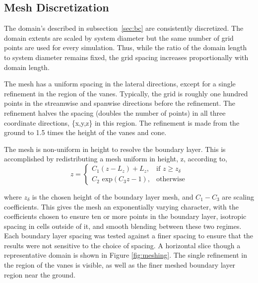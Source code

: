 %
%


\subsection{Mesh Discretization}
%
%
The domain's described in subsection~\ref{sec:bc} are
consistently discretized. The domain extents
are scaled by system diameter but the same number of grid points are used
for every simulation. Thus, while the ratio of the domain length to system
diameter remains fixed, the grid spacing increases proportionally with
domain length. 

The mesh has a uniform spacing in the lateral directions, except for a
single refinement in the region of the vanes. Typically, the grid is 
roughly one hundred points in the streamwise and spanwise directions
before the refinement. The refinement halves the spacing (doubles the
number of points) in all three
coordinate directions, \{x,y,z\} in this region. The refinement is made
from the ground to 1.5 times the height of the vanes and cone. 

The mesh is non-uniform in height to
resolve the boundary layer. This is accomplished by redistributing a
mesh uniform in height, z, according to,
\begin{equation}
 z = \begin{cases} C_1(z-L_z)+L_z,& \text{if } z \geq z_\delta\\
      C_2 \text{ exp}(C_3 z - 1),                 & \text{otherwise}
     \end{cases}
\end{equation}

where $z_\delta$ is the chosen height of the boundary layer mesh, and
$C_1-C_3$ are scaling coefficients. This gives the mesh an exponentially
varying character, with the coefficients chosen to ensure ten or more
points in the boundary layer, isotropic spacing in cells outside of
it, and smooth blending between these two regimes. Each boundary layer
spacing was tested against a finer spacing to ensure that the results
were not sensitive to the choice of spacing. A horizontal slice though a
representative domain is shown in Figure \ref{fig:meshing}. The single
refinement in the region of the vanes is visible, as well as the finer
meshed boundary layer region near the ground. 

